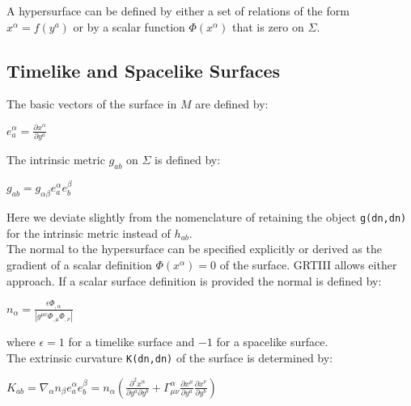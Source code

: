 \documentclass{article}
\begin{document}
A hypersurface can be defined by either a set of relations of the form $x^\alpha = f(y^a)$ or by a scalar function $\Phi(x^\alpha)$ that is zero on 
$\Sigma$. \\

\subsection{Timelike and Spacelike Surfaces}

The basic vectors of the surface in $M$ are defined by:
\begin{center}
$e^{\alpha}_{a} = \frac{\partial x^{\alpha}}{\partial y^a}$
\end{center}


The intrinsic metric $g_{a b}$ on $\Sigma$ is defined by:
\begin{center}
$g_{a b} = g_{\alpha \beta} e^{\alpha}_a e^{\beta}_b$
\end{center}
Here we deviate slightly from the nomenclature of \cite{poisson:2004} retaining the object \texttt{g(dn,dn)} for the intrinsic metric instead of $h_{a b}$. \\

The normal to the hypersurface can be specified explicitly or derived as the gradient of a scalar definition $\Phi(x^\alpha) = 0$ of the surface. GRTIII 
allows either approach. If a scalar surface definition is provided the normal is defined by:
\begin{center}
$n_\alpha = \frac{\epsilon \Phi_{,\alpha}}{\left| g^{\mu \nu} \Phi_{,\mu} \Phi_{,\nu} \right|}$
\end{center}
where $\epsilon=1$ for a timelike surface and $-1$ for a spacelike surface. \\

The extrinsic curvature \texttt{K(dn,dn)} of the surface is determined by:
\begin{center}
$K_{a b} = \nabla_\alpha n_\beta e^\alpha_a e^\beta_b = n_\alpha \left( \frac{\partial^2 x^\alpha}{\partial y^a \partial y^b}
+ \Gamma^\alpha_{\mu \nu} \frac{\partial x^{\mu}}{\partial y^a} \frac{\partial x^{\nu}}{\partial y^b} \right)$
\end{center}
\end{document}
